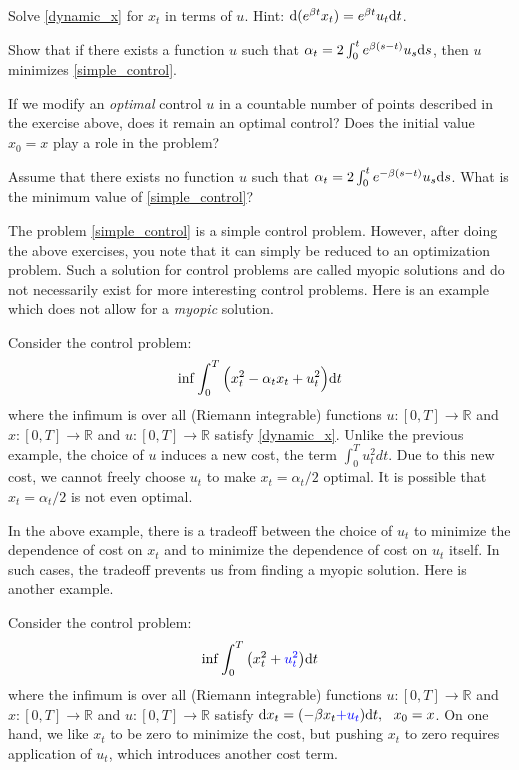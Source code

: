 \documentclass[11pt]{book}
\newcommand{\dd}{\text{\normalfont d}}
\newcommand{\dt}{\text{\normalfont d}t}
\newcommand{\ds}{\text{\normalfont d}s}
\newcommand{\dx}{\text{\normalfont d}x}
\begin{document}
\begin{ex}
Solve \eqref{dynamic_x} for $x_t$ in terms of $u$. Hint: $\dd(e^{\beta t}x_t)=e^{\beta t}u_t{\dt}$.
\end{ex}
\begin{ex}
Show that if there exists a function $u$ such that $\alpha_t=2\int_0^te^{\beta (s-t)}u_s {{\ds}}$, then $u$ minimizes \eqref{simple_control}.
\end{ex}
\begin{ex}
    If we modify an \emph{optimal} control $u$ in a countable number of points described in the exercise above, does it remain an optimal control? Does the initial value $x_0=x$ play a role in the problem?
\end{ex}
\begin{ex}
Assume that there exists no function $u$ such that $\alpha_t=2\int_0^te^{-\beta (s-t)}u_s {{\ds}}$. What is the minimum value of \eqref{simple_control}?
\end{ex}

The problem \eqref{simple_control} is a simple control problem. However, after doing the above exercises, you note that it can simply be reduced to an optimization problem. Such a solution for control problems are called myopic solutions and do not necessarily exist for more interesting control problems. Here is an example which does not allow for a \emph{myopic} solution.
\begin{eg}
    Consider the control problem: \begin{equation}\label{cost_u}
        \inf \int_0^T\Big(x_t^2 - \alpha_t x_t + u_t^2 \Big) {\dt} 
    \end{equation}
where the infimum is over all (Riemann integrable) functions $u:[0,T]\to\mathbb{R}$ and $x:[0,T]\to\mathbb{R}$ and ${u:[0,T]\to\mathbb{R}}$ satisfy  \eqref{dynamic_x}. Unlike the previous example, the choice of $u$ induces a new cost, the term $\int_0^T u_t^2 dt$. Due to this new cost, we cannot freely choose $u_t$ to make $x_t=\alpha_t/2$ optimal. It is possible that $x_t=\alpha_t/2$ is not even optimal. 
\end{eg}
In the above example, there is a tradeoff between the choice of $u_t$ to minimize the  dependence of cost on $x_t$ and to minimize  the dependence of cost on $u_t$ itself. In such cases, the tradeoff prevents us from finding a myopic solution. Here is another example.
\begin{eg}
    Consider the control problem: \begin{equation}
        \inf \int_0^T \big(x_t^2+{\color{blue}u_t^2}\big)  {\dt} 
    \end{equation}
    where the infimum is over all (Riemann integrable) functions $u:[0,T]\to\mathbb{R}$ and $x:[0,T]\to\mathbb{R}$ and ${u:[0,T]\to\mathbb{R}}$ satisfy  ${\dx}_t = (-\beta x_t  {\color{blue}+ u_t}) {\dt}, ~~ x_0=x$. 
    On one hand, we like $x_t$ to be zero to minimize the cost, but pushing $x_t$ to zero requires application of $u_t$, which introduces another cost term.
\end{eg}
\end{document}
